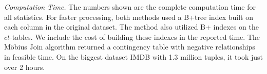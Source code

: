 \documentclass{sig-alternate-2013}
\newcommand{\ct}{\mathit{ct}}
\begin{document}
\begin{table} \centering
\caption{Constructing the contingency table for each dataset. 
M = million. N.T. = non-termination. Compress Ratio = CP-\#tuples/\#Statistics.
  \label{table:cttimes}}
\end{table}


{\em Computation Time.} The numbers shown are the complete computation time for all statistics. For faster processing, both methods used a B+tree index built on each column in the original dataset. The \MJ method also utilized B+ indexes on the $\ct$-tables. We include the cost of building these indexes in the reported time. 
%
%
The M\"obius Join algorithm returned a contingency table with negative relationships in feasible time. On the biggest dataset IMDB with 1.3 million tuples, it took just over 2 hours. 
\end{document}
